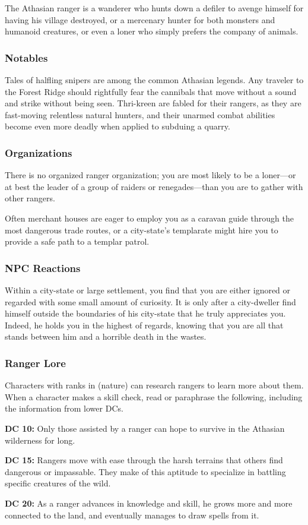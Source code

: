 The Athasian ranger is a wanderer who hunts down a defiler to avenge himself for having his village destroyed, or a mercenary hunter for both monsters and humanoid creatures, or even a loner who simply prefers the company of animals.

\subsubsection{Notables}

Tales of halfling snipers are among the common Athasian legends. Any traveler to the Forest Ridge should rightfully fear the cannibals that move without a sound and strike without being seen. Thri-kreen are fabled for their rangers, as they are fast-moving relentless natural hunters, and their unarmed combat abilities become even more deadly when applied to subduing a quarry.

\subsubsection{Organizations}

There is no organized ranger organization; you are most likely to be a loner---or at best the leader of a group of raiders or renegades---than you are to gather with other rangers.

Often merchant houses are eager to employ you as a caravan guide through the most dangerous trade routes, or a city-state's templarate might hire you to provide a safe path to a templar patrol.

\subsubsection{NPC Reactions}

Within a city-state or large settlement, you find that you are either ignored or regarded with some small amount of curiosity. It is only after a city-dweller find himself outside the boundaries of his city-state that he truly appreciates you. Indeed, he holds you in the highest of regards, knowing that you are all that stands between him and a horrible death in the wastes.

\subsubsection{Ranger Lore}

Characters with ranks in  (nature) can research rangers to learn more about them. When a character makes a skill check, read or paraphrase the following, including the information from lower DCs.

\textbf{DC 10:} Only those assisted by a ranger can hope to survive in the Athasian wilderness for long.

\textbf{DC 15:} Rangers move with ease through the harsh terrains that others find dangerous or impassable. They make of this aptitude to specialize in battling specific creatures of the wild.

\textbf{DC 20:} As a ranger advances in knowledge and skill, he grows more and more connected to the land, and eventually manages to draw spells from it.
